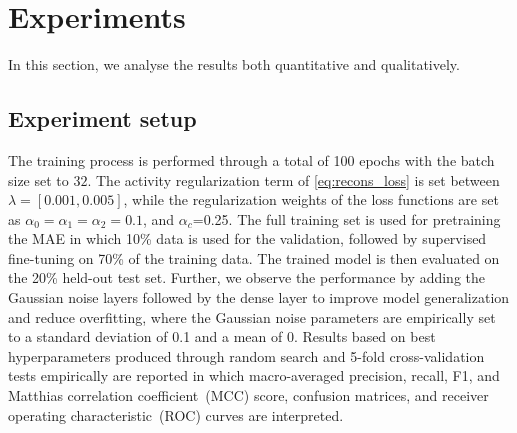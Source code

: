 \section{Experiments}\label{chapter_4:results}
In this section, we analyse the results both quantitative and qualitatively. 

\subsection{Experiment setup}
The training process is performed through a total of 100 epochs with the batch size set to $32$. The activity regularization term of \cref{eq:recons_loss} is set between $\lambda=[0.001, 0.005]$, while the regularization weights of the loss functions are set as  $\alpha_{0}=\alpha_{1}=\alpha_{2}=0.1$, and $\alpha_{c}$=0.25. 
The full training set is used for pretraining the MAE in which 10\% data is used for the validation, followed by supervised fine-tuning on 70\% of the training data. The trained model is then evaluated on the 20\% held-out test set. Further, we observe the performance by adding the Gaussian noise layers followed by the dense layer to improve model generalization and reduce overfitting, where the Gaussian noise parameters are empirically set to a standard deviation of 0.1 and a mean of 0. Results based on best hyperparameters produced through random search and 5-fold cross-validation tests empirically are reported in which macro-averaged precision, recall, F1, and Matthias correlation coefficient~(MCC) score, confusion matrices, and receiver operating characteristic~(ROC) curves are interpreted.

